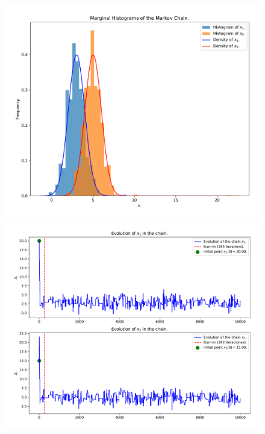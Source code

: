 \begin{figure}[h!]
	\centering
	\begin{minipage}{0.495\textwidth}
		\centering
		\includegraphics[width=\textwidth]{IMAGENES/ex3/histograms_example2.pdf}
	\end{minipage}
	\hfill
	\begin{minipage}{0.495\textwidth}
		\centering
		\includegraphics[width=\textwidth]{IMAGENES/ex3/evolution_example2.pdf}
	\end{minipage}
\end{figure}

